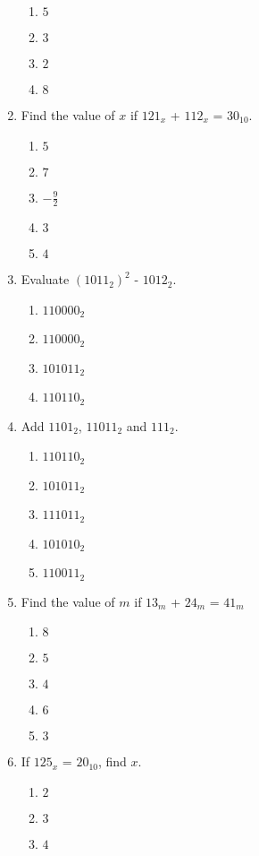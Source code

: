 \begin{multicols}{2}
\begin{enumerate}[label={\arabic*.}]
\begin{enumerate}[label={\Alph*.}]
	\item \(5\)
	\item \(3\)
	\item \(2\)
	\item \(8\)
	\end{enumerate}
\item Find the value of \(x\) if \({121}_x\) + \({112}_x\) = \({30}_{10}\).
	\begin{enumerate}[label={\Alph*.}]
	\item \(5\)
	\item \(7\)
	\item \(-{\frac{9}{2}}\)
	\item \(3\)
	\item \(4\)
	\end{enumerate}
\item Evaluate \(({1011}_2)^2\) - \({1012}_2\).
	\begin{enumerate}[label={\Alph*.}]
	\item \({110000}_2\)
	\item \({110000}_2\)
	\item \({101011}_2\)
	\item \({110110}_2\)
	\end{enumerate}
\item Add \({1101}_2\), \({11011}_2\) and \({111}_2\).
	\begin{enumerate}[label={\Alph*.}]
	\item \({110110}_2\)
	\item \({101011}_2\)
	\item \({111011}_2\)
	\item \({101010}_2\)
	\item \({110011}_2\)
	\end{enumerate}
\item Find the value of \(m\) if \({13}_m\) + \({24}_m\) = \({41}_m\)
	\begin{enumerate}[label={\Alph*.}]
	\item \(8\)
	\item \(5\)
	\item \(4\)
	\item \(6\)
	\item \(3\)
	\end{enumerate}
\item If \({125}_x\) = \({20}_10\), find \(x\).
	\begin{enumerate}[label={\Alph*.}]
	\item \(2\)
	\item \(3\)
	\item \(4\)

\end{enumerate}
\end{enumerate}
\end{multicols}
